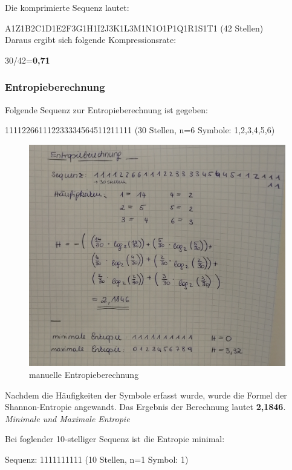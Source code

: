 \documentclass[12pt,german]{article}
\begin{document}
Die komprimierte Sequenz lautet:

A1Z1B2C1D1E2F3G1H1I2J3K1L3M1N1O1P1Q1R1S1T1 (42 Stellen)\\

Daraus ergibt sich folgende Kompressionsrate:

30/42=\textbf{0,71}\\

\subsubsection{Entropieberechnung}
Folgende Sequenz zur Entropieberechnung ist gegeben:

111122661112233334564511211111 (30 Stellen, n=6 Symbole: 1,2,3,4,5,6)\\

\begin{figure}[H]
	\centering
	\includegraphics[width=12cm]{images/entropieBerechnung.jpg}
	\caption{manuelle Entropieberechnung}
	\label{fig:resultEntropie}
\end{figure}

Nachdem die Häufigkeiten der Symbole erfasst wurde, wurde die Formel der Shannon-Entropie angewandt. Das Ergebnis der Berechnung lautet \textbf{2,1846}. \\

\textit{Minimale und Maximale Entropie}

Bei foglender 10-stelliger Sequenz ist die Entropie minimal:

Sequenz: 1111111111 (10 Stellen, n=1 Symbol: 1)
\end{document}
